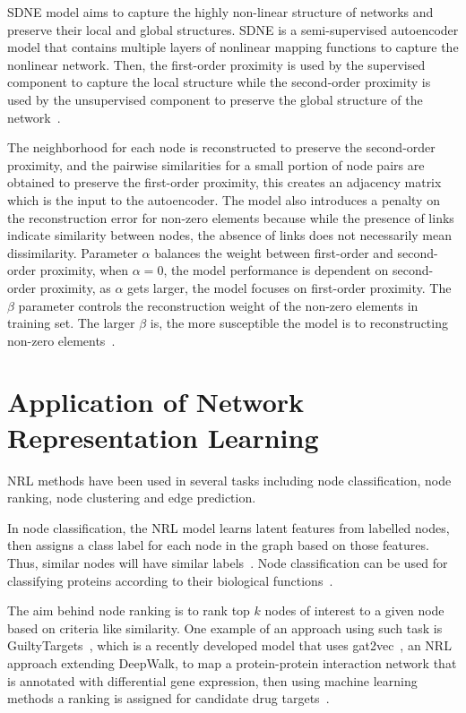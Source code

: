 \ac{SDNE} model aims to capture the highly non-linear structure of networks and preserve their local and global structures.
\ac{SDNE} is a semi-supervised autoencoder model that contains multiple layers of nonlinear mapping functions to capture the nonlinear network.
Then, the first-order proximity is used by the supervised component to capture the local structure while the second-order proximity is used by the unsupervised component to preserve the global structure of the network~\cite{wang_structural_2016}.

The neighborhood for each node is reconstructed to preserve the second-order proximity, and the pairwise similarities for a small portion of node pairs are obtained to preserve the first-order proximity, this creates an adjacency matrix which is the input to the autoencoder.
The model also introduces a penalty on the reconstruction error for non-zero elements because while the presence of links indicate similarity between nodes, the absence of links does not necessarily mean dissimilarity.
Parameter $\alpha$ balances the weight between first-order and second-order proximity, when $\alpha=0$, the model performance is dependent on second-order proximity, as $\alpha$ gets larger, the model focuses on first-order proximity.
The $\beta$ parameter controls the reconstruction weight of the non-zero elements in training set.
The larger $\beta$ is, the more susceptible the model is to reconstructing non-zero elements~\cite{wang_structural_2016}.

\section{Application of Network Representation Learning}

\ac{NRL} methods have been used in several tasks including node classification, node ranking, node clustering and edge prediction.

In node classification, the \ac{NRL} model learns latent features from labelled nodes, then assigns a class label for each node in the graph based on those features.
Thus, similar nodes will have similar labels~\cite{cui_survey_2017}.
Node classification can be used for classifying proteins according to their biological functions~\cite{grover_node2vec:_2016}.

The aim behind node ranking is to rank top $k$ nodes of interest to a given node based on criteria like similarity.
One example of an approach using such task is GuiltyTargets~\cite{muslu_guiltytargets:_2019}, which is a recently developed model that uses gat2vec~\cite{sheikh_gat2vec:_2018}, an \ac{NRL} approach extending DeepWalk, to map a protein-protein interaction network that is annotated with differential gene expression, then using machine learning methods a ranking is assigned for candidate drug targets~\cite{muslu_guiltytargets:_2019}.

